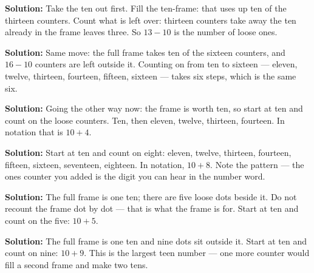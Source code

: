 \documentclass[12pt]{article}
\begin{document}




\textbf{Solution:} Take the ten out first. Fill the ten-frame: that uses up ten of the thirteen counters. Count what is left over: thirteen counters take away the ten already in the frame leaves three. So $13 - 10$ is the number of loose ones. 


\textbf{Solution:} Same move: the full frame takes ten of the sixteen counters, and $16 - 10$ counters are left outside it. Counting on from ten to sixteen --- eleven, twelve, thirteen, fourteen, fifteen, sixteen --- takes six steps, which is the same six. 


\textbf{Solution:} Going the other way now: the frame is worth ten, so start at ten and count on the loose counters. Ten, then eleven, twelve, thirteen, fourteen. In notation that is $10 + 4$. 


\textbf{Solution:} Start at ten and count on eight: eleven, twelve, thirteen, fourteen, fifteen, sixteen, seventeen, eighteen. In notation, $10 + 8$. Note the pattern --- the ones counter you added is the digit you can hear in the number word. 


\textbf{Solution:} The full frame is one ten; there are five loose dots beside it. Do not recount the frame dot by dot --- that is what the frame is for. Start at ten and count on the five: $10 + 5$. 


\textbf{Solution:} The full frame is one ten and nine dots sit outside it. Start at ten and count on nine: $10 + 9$. This is the largest teen number --- one more counter would fill a second frame and make two tens. 
\end{document}
